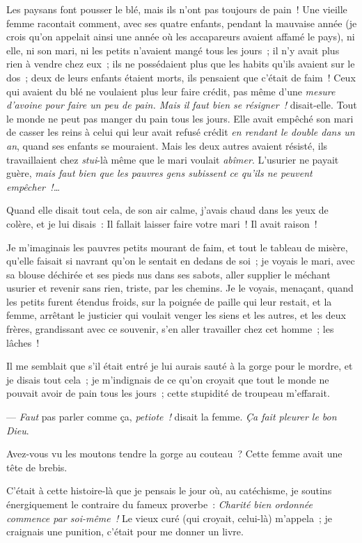 \documentclass[french,twoside]{book} %
\begin{document}
Les paysans font pousser le blé, mais ils n’ont pas toujours de pain ! Une vieille femme racontait comment, avec ses quatre enfants, pendant la mauvaise année (je crois qu’on appelait ainsi une année où les accapareurs avaient affamé le pays), ni elle, ni son mari, ni les petits n’avaient mangé tous les jours ; il n’y avait plus rien à vendre chez eux ; ils ne possédaient plus que les habits qu’ils avaient sur le dos ; deux de leurs enfants étaient morts, ils pensaient que c’était de faim ! Ceux qui avaient du blé ne voulaient plus leur faire crédit, pas même d’une \emph{mesure d’avoine pour faire un peu de pain. Mais il faut bien se résigner !} disait-elle. Tout le monde ne  peut pas manger du pain tous les jours. Elle avait empêché son mari de casser les reins à celui qui leur avait refusé crédit \emph{en rendant le double dans un an}, quand ses enfants se mouraient. Mais les deux autres avaient résisté, ils travaillaient chez \emph{stui}-là même que le mari voulait \emph{abîmer}. L’usurier ne payait guère, \emph{mais faut bien que les pauvres gens subissent ce qu’ils ne peuvent empêcher !…}\par
Quand elle disait tout cela, de son air calme, j’avais chaud dans les yeux de colère, et je lui disais : Il fallait laisser faire votre mari ! Il avait raison !\par
Je m’imaginais les pauvres petits mourant de faim, et tout le tableau de misère, qu’elle faisait si navrant qu’on le sentait en dedans de soi ; je voyais le mari, avec sa blouse déchirée et ses pieds nus dans ses sabots, aller supplier le méchant usurier et revenir sans rien, triste, par les chemins. Je le voyais, menaçant, quand les petits furent étendus froids, sur la poignée de paille qui leur restait, et la femme, arrêtant le justicier qui voulait venger les siens et les autres, et les deux frères, grandissant avec ce souvenir, s’en aller travailler chez cet homme ; les lâches !\par
Il me semblait que s’il était entré je lui aurais sauté à la gorge pour le mordre, et je disais tout  cela ; je m’indignais de ce qu’on croyait que tout le monde ne pouvait avoir de pain tous les jours ; cette stupidité de troupeau m’effarait.\par
— \emph{Faut} pas parler comme ça, \emph{petiote !} disait la femme. \emph{Ça fait pleurer le bon Dieu}.\par
Avez-vous vu les moutons tendre la gorge au couteau ? Cette femme avait une tête de brebis.\par
C’était à cette histoire-là que je pensais le jour où, au catéchisme, je soutins énergiquement le contraire du fameux proverbe : \emph{Charité bien ordonnée commence par soi-même !} Le vieux curé (qui croyait, celui-là) m’appela ; je craignais une punition, c’était pour me donner un livre.\par
\end{document}
